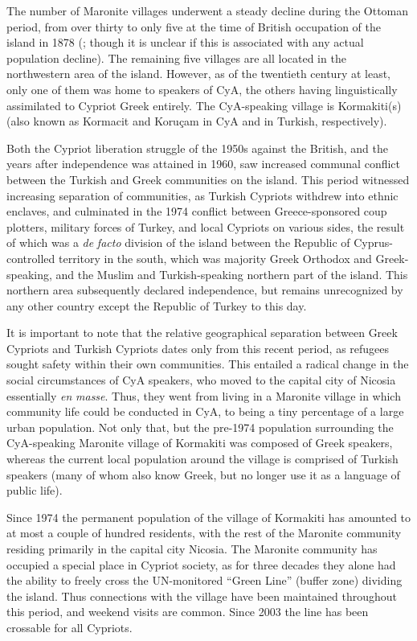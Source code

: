 \documentclass[output=paper]{langsci/langscibook}
\begin{document}
The number of Maronite villages underwent a steady decline during the Ottoman period, from over thirty to only five at the time of British occupation of the island in 1878 (\citealt{BaiderKariolemou2015}; though it is unclear if this is associated with any actual population decline). The remaining five villages are all located in the northwestern area of the island. However, as of the twentieth century at least, only one of them was home to speakers of CyA, the others having linguistically assimilated to Cypriot Greek entirely. The CyA-speaking village is Kormakiti(s) (also known as Kormacit and Koruçam in CyA and in Turkish, respectively). 

Both the Cypriot liberation struggle of the 1950s against the British, and the years after independence was attained in 1960, saw increased communal conflict between the Turkish and Greek communities on the island. This period witnessed increasing separation of communities, as Turkish Cypriots withdrew into ethnic enclaves, and  culminated in the 1974 conflict between Greece-sponsored coup plotters, military forces of Turkey, and local Cypriots on various sides, the result of which was a \textit{de} \textit{facto} division of the island between the Republic of Cyprus-controlled territory in the south, which was majority Greek Orthodox and Greek-speaking, and the Muslim and Turkish-speaking northern part of the island. This northern area subsequently declared independence, but remains unrecognized by any other country except the Republic of Turkey to this day. 

It is important to note that the relative geographical separation between Greek Cypriots and Turkish Cypriots dates only from this recent period, as refugees sought safety within their own communities. This entailed a radical change in the social circumstances of CyA speakers, who moved to the capital city of Nicosia essentially \textit{en} \textit{masse}. Thus, they went from living in a Maronite village in which community life could be conducted in CyA, to being a tiny percentage of a large urban population. Not only that, but the pre-1974 population surrounding the CyA-speaking Maronite village of Kormakiti was composed of Greek speakers, whereas the current local population around the village is comprised of Turkish speakers (many of whom also know Greek, but no longer use it as a language of public life). 

Since 1974 the permanent population of the village of Kormakiti has amounted to at most a couple of hundred residents, with the rest of the Maronite community residing primarily in the capital city Nicosia. The Maronite community has occupied a special place in Cypriot society, as for three decades they alone had the ability to freely cross the UN-monitored “Green Line” (buffer zone) dividing the island. Thus connections with the village have been maintained throughout this period, and weekend visits are common. Since 2003 the line has been crossable for all Cypriots.
\end{document}
